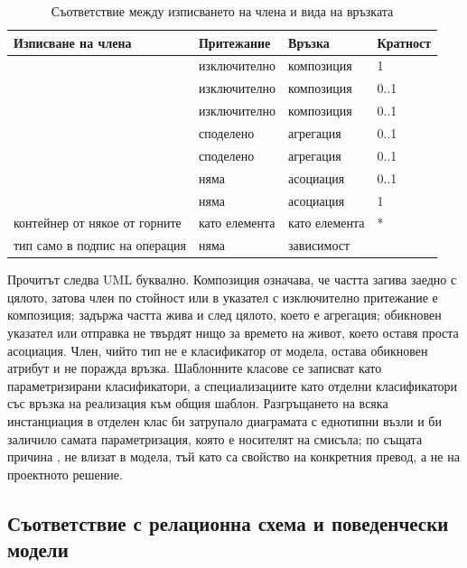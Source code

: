 \begin{table}[H]
\caption{Съответствие между изписването на члена и вида на връзката}
\label{tab:ownership}
\centering
\fontsize{10}{11}\selectfont
{}
\begin{tabular}{@{}L{4.6cm}L{2.6cm}L{3.0cm}L{1.8cm}@{}}
\toprule
\textbf{Изписване на члена} & \textbf{Притежание} & \textbf{Връзка} & \textbf{Кратност} \\
\midrule
{}                    & изключително & композиция  & 1 \\
        & изключително & композиция  & 0..1 \\
           & изключително & композиция  & 0..1 \\
        & споделено    & агрегация   & 0..1 \\
          & споделено    & агрегация   & 0..1 \\
                         & няма         & асоциация   & 0..1 \\
                        & няма         & асоциация   & 1 \\
контейнер от някое от горните     & като елемента & като елемента & * \\
тип само в подпис на операция     & няма         & зависимост  & \\
\bottomrule
\end{tabular}
\end{table}

Прочитът следва UML буквално. Композиция означава, че частта загива заедно с цялото, затова член по
стойност или в указател с изключително притежание е композиция;  задържа частта
жива и след цялото, което е агрегация; обикновен указател или отправка не твърдят нищо за времето на
живот, което оставя проста асоциация. Член, чийто тип не е класификатор от модела, остава обикновен
атрибут и не поражда връзка. Шаблонните класове се записват като параметризирани класификатори, а
специализациите като отделни класификатори със връзка на реализация към общия шаблон. Разгръщането
на всяка инстанциация в отделен клас би затрупало диаграмата с еднотипни възли и би заличило самата
параметризация, която е носителят на смисъла; по същата причина , не влизат в модела, тъй като са свойство на конкретния превод, а не на проектното
решение.

\subsection{Съответствие с релационна схема и поведенчески модели}


